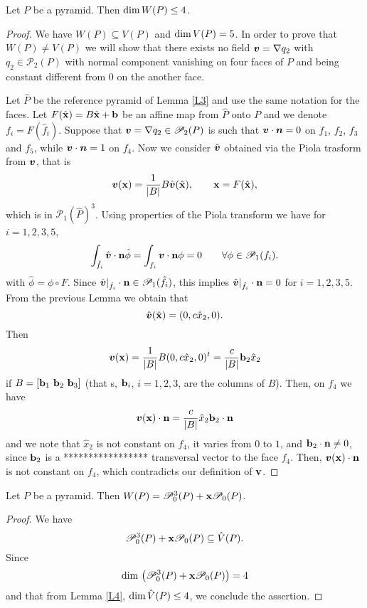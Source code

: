 \begin{lemma}\label{L4}
Let $P$ be a pyramid. Then $\mbox{dim\,}W(P)\le4$.
\end{lemma}
\begin{proof}
We have $W(P)\subseteq V(P)$ and $\mbox{dim\,}V(P)=5$. In order to prove that $W(P)\ne
V(P)$ we will show that there exists no field
$\boldsymbol{v}=\nabla q_2$ with $q_2\in \mathcal P_2(P)$ with normal
component vanishing on four faces of $P$ and being constant different from $0$ on
the another face.

Let $\hat P$ be the reference pyramid of Lemma \ref{L3} and
use the same notation for the faces. Let $F(\hat {\bf x})=B\hat
{\bf x} + {\bf b}$ be an affine map from $\hat P$ onto $P$ and we denote
$f_i=F(\hat f_i)$. Suppose
that $\boldsymbol{v}=\nabla q_2\in \mathcal P_2(P)$ is such that
$\boldsymbol{v}\cdot\boldsymbol{n}=0$ on $f_1$, $f_2$, $f_3$ and $f_5$, while
$\boldsymbol{v}\cdot\boldsymbol{n}=1$ on $f_4$. Now we consider $\hat{\boldsymbol{v}}$
obtained via the Piola trasform from $\boldsymbol{v}$, that is
\begin{equation}\label{piola}
\boldsymbol{v}({\bf x}) = \frac1{|B|}B\hat{\boldsymbol{v}}(\hat{\bf x}), \qquad {\bf x}=F(\hat {\bf x}),
\end{equation}
which is in $\mathcal P_1(\hat P)^3$. Using properties of the Piola transform
\cite[pages 12--14]{ricardoMixed} we have for $i=1,2,3,5$,
\[
\int_{\hat f_i}\hat {\boldsymbol{v}}\cdot {\bf n}\hat\phi = \int_{f_i}\boldsymbol{v}\cdot {\bf n}\phi =0\qquad \forall \phi\in\mathcal P_1(f_i).
\]
with $\hat \phi = \phi\circ F$. Since $\hat{\boldsymbol{v}}|_{\hat f_i}\cdot {\bf n}\in\mathcal P_1(\hat f_i)$, this implies $\hat{\boldsymbol{v}}|_{\hat f_i}\cdot {\bf n}=0$ for $i=1,2,3,5$. From the previous Lemma we obtain that
\[
\hat{\boldsymbol{v}}(\hat{\bf x})=(0,c\hat x_2,0).
\]
Then
\[
\boldsymbol{v}({\bf x})=\frac1{|B|}B(0,c\hat x_2,0)^t = \frac c{|B|}{\bf b}_2 \hat x_2
\]
if $B=[{\bf b}_1\,\,{\bf b}_2\,\,{\bf b}_3]$ (that s, ${\bf b}_i$, $i=1,2,3$,  are the columns of $B$). Then, on $f_4$ we have 
\[
\boldsymbol{v}({\bf x})\cdot {\bf n}=\frac c{|B|}\hat x_2{\bf b}_2\cdot {\bf n} 
\]
and we note that $\hat x_2$ is not constant on $f_4$, it varies from $0$ to $1$,
and ${\bf b}_2\cdot {\bf n}\ne 0$, since ${\bf b}_2$ is a 
{\color{Orange}***************** transversal} 
vector to
the face $f_4$. Then, $\boldsymbol{v}({\bf x})\cdot {\bf n}$ is not constant on $f_4$,
which contradicts our definition of $\bf v$.  
\end{proof}

\begin{proposition}
Let $P$ be a pyramid. Then $W(P)=\mathcal
P_0^3(P)+{\bf x}\mathcal P_0(P)$.
\end{proposition}
\begin{proof}
We have
\[
\mathcal P_0^3(P)+{\bf x}\mathcal P_0(P)\subseteq \hat
V(P).
\]
Since
\[
\mbox{dim\,}\left(\mathcal P_0^3(P)+{\bf x}\mathcal
P_0(P)\right)=4
\]
and that from Lemma \ref{L4}, $\mbox{dim\,}\hat
V(P)\le4$, we conclude the assertion.
\end{proof}

